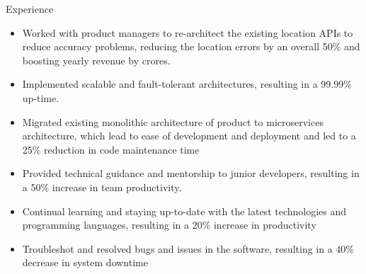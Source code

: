 \documentclass{resume} %
\begin{document}
\introduction[
    fullname=Prabal Tiwari,
    email=prabaltiwari09@gmail.com,
    phone=+91-9770283837,
    linkedin=linkedin.com/in/prabaltiwari,
    github=github.com/prabaltiwari09
]

\skills{
    \skillItem[
        category=Language(s),
        skills=Javascript{,} Java
    ] \\
    \skillItem[
        category=Database(s),
        skills=MySQL{,} MongoDB{,} Redis
    ] \\
    \skillItem[
        category=Framework(s),
        skills=Express.JS{,} Node.JS{,} Spring Boot
    ] \\
    \skillItem[
        category=Tool(s),
        skills= Microservices{,} JIRA{,} Postman{,} Git{,} BitBucket{,} AWS
    ]
}

\begin{workSection}{Experience}
    \experienceItem[
        company=Rebel Foods Private Limited,
        location=Mumbai{,} India,
        position=Software Development Engineer - 1,
        duration=Aug 2021 – Jun 2023
    ]
     \begin{itemize}
        \itemsep -6pt {} 
        \item Worked with product managers to re-architect the existing location APIs to reduce accuracy problems, reducing the
location errors by an overall 50\% and boosting yearly revenue by crores.
        \item Implemented scalable and fault-tolerant architectures, resulting in a 99.99\% up-time.

     \end{itemize}
     
    \experienceItem[
        company=Rakuten Symphony (Formerly InnoEye Technologies),
        location=Indore{,} India,
        position=Software Engineer,
        duration=Feb 2020 – Aug 2021
    ]
    \begin{itemize}
        \itemsep -6pt {} 
        \item Migrated existing monolithic architecture of product to microservices architecture, which lead to ease of development
and deployment and led to a 25\% reduction in code maintenance time
        \item Provided technical guidance and mentorship to junior developers, resulting in a 50\% increase in team productivity.
     \end{itemize}

    \experienceItem[
        company=Hanhas Technologies,
        location=Indore{,} India,
        position=Software Engineer,
        duration=Jul 2019 – Nov 2019
    ]
    \begin{itemize}
        \itemsep -6pt {} 
        \item Continual learning and staying up-to-date with the latest technologies and programming languages, resulting in a
20\% increase in productivity
        \item Troubleshot and resolved bugs and issues in the software, resulting in a 40\% decrease in system downtime
     \end{itemize}
     
\end{workSection}
\end{document}
